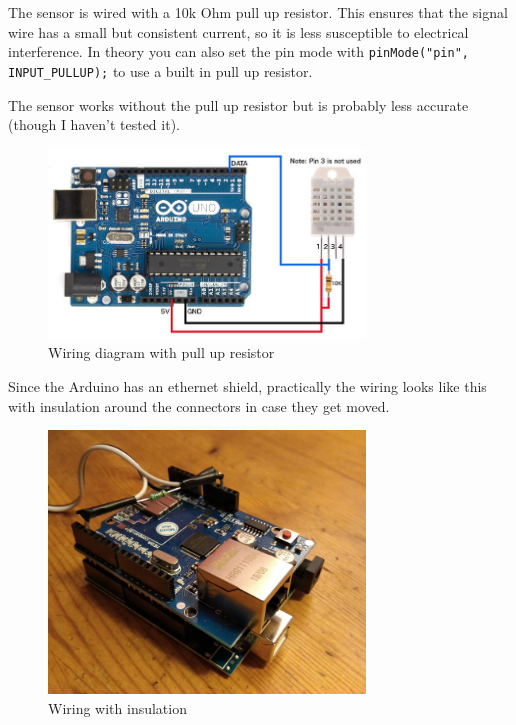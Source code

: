 \documentclass[a4paper, 11pt]{article}
\begin{document}
The sensor is wired with a 10k Ohm pull up resistor.
This ensures that the signal wire has a small but consistent current,
so it is less susceptible to electrical interference.
In theory you can also set the pin mode with \verb|pinMode("pin", INPUT_PULLUP);|
to use a built in pull up resistor.

The sensor works without the pull up resistor but is probably less accurate
(though I haven't tested it).

\begin{figure}[H]
  \centering
  \includegraphics[width=0.75\textwidth]{wiring-dht22.jpg}
  \caption{Wiring diagram with pull up resistor}
\end{figure}

Since the Arduino has an ethernet shield,
practically the wiring looks like this with
insulation around the connectors in case they get moved.

\begin{figure}[H]
  \centering
  \includegraphics[width=0.75\textwidth]{wiring-with-ethernet.jpg}
  \caption{Wiring with insulation}
\end{figure}

\end{document}
